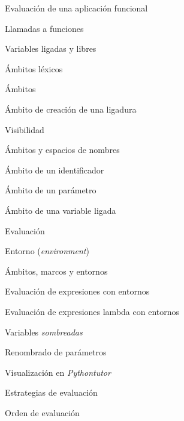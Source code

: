 \begin{longenum}
\begin{longenum}
\begin{longenum}
            \begin{longenum}
                \item Evaluación de una aplicación funcional
                \item Llamadas a funciones
            \end{longenum}
            \item Variables ligadas y libres
        \end{longenum}
        \item Ámbitos léxicos
        \begin{longenum}
            \item Ámbitos
            \item Ámbito de creación de una ligadura
            \begin{longenum}
                \item Visibilidad
            \end{longenum}
            \item Ámbitos y espacios de nombres
            \item Ámbito de un identificador
            \item Ámbito de un parámetro
            \item Ámbito de una variable ligada
        \end{longenum}
        \item Evaluación
        \begin{longenum}
            \item Entorno (\textit{environment})
            \begin{longenum}
                \item Ámbitos, marcos y entornos
            \end{longenum}
            \item Evaluación de expresiones con entornos
            \item Evaluación de expresiones lambda con entornos
            \begin{longenum}
                \item Variables \textit{sombreadas}
                \item Renombrado de parámetros
                \item Visualización en \textit{Pythontutor}
            \end{longenum}
            \item Estrategias de evaluación 
            \begin{longenum}
                \item Orden de evaluación

\end{longenum}
\end{longenum}
\end{longenum}
\end{longenum}
